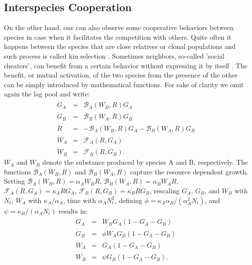 \documentclass[10pt,A4paper]{article}
\begin{document}
\subsection{Interspecies Cooperation}
On the other hand, one can also observe some cooperative behaviors between species in case when it facilitates the competition with others.
Quite often it happens between the species that are close relatives or clonal populations and such process is called kin selection \cite{west_social_2007}.
Sometimes neighbors, so-called 'social cheaters', can benefit from a certain behavior without expressing it by itself \cite{rainey_evolution_2003}.
%
%
%
The benefit, or mutual activation, of the two species from the presence of the other can be simply introduced by mathematical functions. 
For sake of clarity we omit again the lag pool and write:
\begin{eqnarray}
    \dot{G}_A &=& \mathcal{B}_A(W_B,R)G_A\\
    \dot{G}_B &=& \mathcal{B}_B(W_A,R)G_B\\
    \dot{R} &=&-\mathcal{B}_A(W_B,R)G_A-\mathcal{B}_B(W_A,R)G_B\\
    \dot{W}_A &=& \mathcal{F}_A(R,G_A)\\
    \dot{W}_B &=& \mathcal{F}_B(R,G_B).
\end{eqnarray}
$W_A$ and $W_B$ denote the substance produced by species A and B, respectively. 
The functions $\mathcal{B}_A(W_B,R)$ and $\mathcal{B}_B(W_A,R)$ capture the resource dependent growth. 
Setting $\mathcal{B}_A(W_B,R)=\alpha_A W_BR$, $\mathcal{B}_B(W_A,R)=\alpha_B W_AR$, $\mathcal{F}_A(R,G_A)=\kappa_A RG_A$, $\mathcal{F}_B(R,G_B)=\kappa_B RG_B$, rescaling $G_A$, $G_B$, and $W_B$ with $N_t$, $W_A$ with $\kappa_A/\alpha_A$, time with $\alpha_AN_t^2$, defining $\phi=\kappa_A\alpha_B/(\alpha_A^2N_t)$, and $\psi=\kappa_B/(\alpha_A N_t)$ results in: 
\begin{eqnarray}
    \dot{G}_A &=& W_BG_A\left(1 - G_A-G_B\right)\\
    \dot{G}_B &=& \phi W_AG_B\left(1 - G_A-G_B\right)\\
    \dot{W}_A &=& G_A\left(1 - G_A-G_B\right)\\
    \dot{W}_B &=&\psi G_B\left(1 - G_A-G_B\right).
\end{eqnarray}
%
%
%
%
\end{document}
